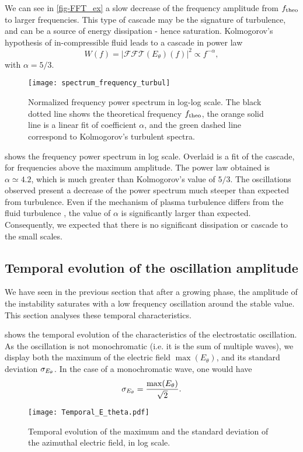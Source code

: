   We can see in \cref{fig-FFT_ex} a slow decrease of the frequency amplitude from $f_{\rm theo}$ to larger frequencies.
  This type of cascade may be the signature of turbulence, and can be a source of energy dissipation - hence saturation.
  Kolmogorov's hypothesis of in-compressible fluid leads to a cascade in power law \[ W(f) = | \mathcal{FFT}(E_{\theta})(f) |^2 \propto f ^ {- \alpha}, \]
  with $\alpha = 5/3$.
  \begin{figure}[!hbt]
    \centering
    \texttt{[image: spectrum\_frequency\_turbul]}
    \caption{Normalized frequency power spectrum in log-log scale. The black dotted line shows the  theoretical frequency $f_{\rm theo}$, the orange solid line is a linear fit of coefficient $\alpha$, and the green dashed line correspond to Kolmogorov's turbulent spectra. }
    \label{fig-turbul}
  \end{figure}
  
   shows the frequency power spectrum in log scale.
  Overlaid is a fit of the cascade, for frequencies above the maximum amplitude.
  The power law obtained is $\alpha \simeq 4.2$, which is much greater than Kolmogorov's value of $5/3$.
  The oscillations observed present a decrease of the power spectrum much steeper than expected from turbulence.
  Even if the mechanism of plasma turbulence differs from the fluid turbulence \citep{tsytovich1972}, the value of $\alpha$ is significantly larger than expected.
  Consequently, we expected that there is no significant dissipation or cascade to the small scales.
  
  \subsection{Temporal evolution of the oscillation amplitude} \label{subsec-temp}
  We have seen in the previous section that after a growing phase, the amplitude of the instability saturates with a low frequency oscillation around the stable value.
  This section analyses these temporal characteristics.
  
   shows the temporal evolution of the characteristics of the electrostatic oscillation.
  As the oscillation is not monochromatic (i.e. it is the sum of multiple waves), we display both the maximum of the electric field $\max(E_{\theta})$, and its standard deviation $\sigma_{E_{\theta}}$.
  In the case of a monochromatic wave, one would have 
  \[ \sigma_{E_{\theta}} = \frac{\max(E_{\theta})}{\sqrt{2}}.  \]
  
  \begin{figure}[!hbt]
    \centering
    \texttt{[image: Temporal\_E\_theta.pdf]}
    \caption{Temporal evolution of the maximum and the standard deviation of the azimuthal electric field, in log scale.}
    \label{fig-Ezstd_time}
  \end{figure}
  
